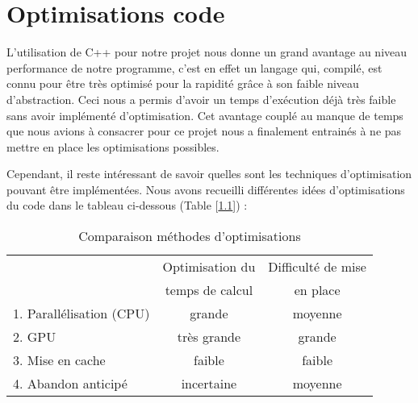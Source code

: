 \chapter{Optimisations code}
\label{chaper-5}





L'utilisation de C++ pour notre projet nous donne un grand avantage au niveau performance de notre programme, c'est en effet un langage qui, compilé, est connu pour être très optimisé pour la rapidité grâce à son faible niveau d'abstraction. Ceci nous a permis d'avoir un temps d'exécution déjà très faible sans avoir implémenté d'optimisation. Cet avantage couplé au manque de temps que nous avions à consacrer pour ce projet nous a finalement entrainés à ne pas mettre en place les optimisations possibles.

Cependant, il reste intéressant de savoir quelles sont les techniques d'optimisation pouvant être implémentées. Nous avons recueilli différentes idées d'optimisations du code dans le tableau ci-dessous (Table [\ref{tab:optimisation-table}]) :

\begin{table}[h]
    \centering
    \begin{tabular}{|l|c|c|}
        \hline
         & Optimisation du & Difficulté de mise \\
         & temps de calcul & en place \\
         \hline
         1. Parallélisation (CPU) & grande & moyenne \\
         2. GPU & très grande & grande \\
         3. Mise en cache & faible & faible \\
         4. Abandon anticipé & incertaine & moyenne \\
         \hline
    \end{tabular}
    \caption{Comparaison méthodes d'optimisations}
    \label{tab:optimisation-table}
\end{table}


